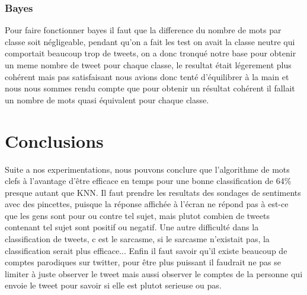 \documentclass[a4paper,10pt]{report}
\begin{document}
    \subsection{Bayes}
      Pour faire fonctionner bayes il faut que la difference du nombre de mots par classe soit négligeable, pendant qu'on a fait les test on avait la classe neutre qui comportait
      beaucoup trop de tweets, on a donc tronqué notre base pour obtenir un meme nombre de tweet pour chaque classe, le resultat était légerement plus cohérent mais pas satisfaisant
      nous avions donc tenté d'équilibrer à la main et nous nous sommes rendu compte que pour obtenir un résultat cohérent il fallait un nombre de mots quasi équivalent pour chaque classe.
    
    
\chapter{Conclusions}
Suite a nos experimentations, nous pouvons conclure que l'algorithme de mots clefs à l'avantage d'être efficace en temps pour une bonne classification de 64\%
presque autant que KNN.
Il faut prendre les resultats des sondages de sentiments avec des pincettes, puisque la réponse affichée à l'écran ne répond pas à 
est-ce que les gens sont pour ou contre tel sujet, mais plutot combien de tweets contenant tel sujet sont positif ou negatif.
Une autre difficulté dans la classification de tweets, c est le sarcasme, si le sarcasme n'existait pas, la classification serait plus efficace...
Enfin il faut savoir qu'il existe beaucoup de comptes parodiques sur twitter, pour être plus puissant il faudrait ne pas se limiter à juste observer le tweet mais
aussi observer le comptes de la personne qui envoie le tweet pour savoir si elle est plutot serieuse ou pas.
\end{document}
